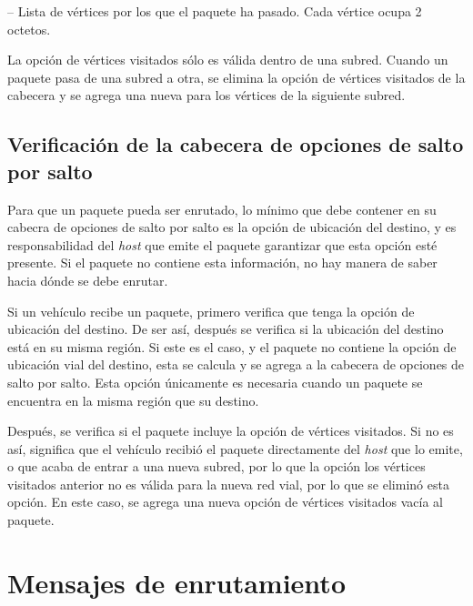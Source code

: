  -- Lista de vértices por los
que el paquete ha pasado. Cada vértice ocupa 2 octetos.

La opción de vértices visitados sólo es válida dentro de una subred. Cuando un
paquete pasa de una subred a otra, se elimina la opción de vértices visitados
de la cabecera y se agrega una nueva para los vértices de la siguiente subred.

\subsection{Verificación de la cabecera de opciones de salto por salto}
\label{subsec:verificacion_cabecera_opciones_salto_por_salto}

Para que un paquete pueda ser enrutado, lo mínimo que debe contener en su
cabecra de opciones de salto por salto es la opción de ubicación del destino, y
es responsabilidad del \textit{host} que emite el paquete garantizar que esta
opción esté presente. Si el paquete no contiene esta información, no hay manera
de saber hacia dónde se debe enrutar.

Si un vehículo recibe un paquete, primero verifica que tenga la opción de
ubicación del destino. De ser así, después se verifica si la ubicación del
destino está en su misma región. Si este es el caso, y el paquete no contiene la
opción de ubicación vial del destino, esta se calcula y se agrega a la cabecera
de opciones de salto por salto. Esta opción únicamente es necesaria cuando un
paquete se encuentra en la misma región que su destino.

Después, se verifica si el paquete incluye la opción de vértices visitados. Si
no es así, significa que el vehículo recibió el paquete directamente del
\textit{host} que lo emite, o que acaba de entrar a una nueva subred, por lo que
la opción los vértices visitados anterior no es válida para la nueva red vial,
por lo que se eliminó esta opción. En este caso, se agrega una nueva opción de
vértices visitados vacía al paquete.

\section{Mensajes de enrutamiento}
\label{sec:mensajes_de_enrutamiento}

